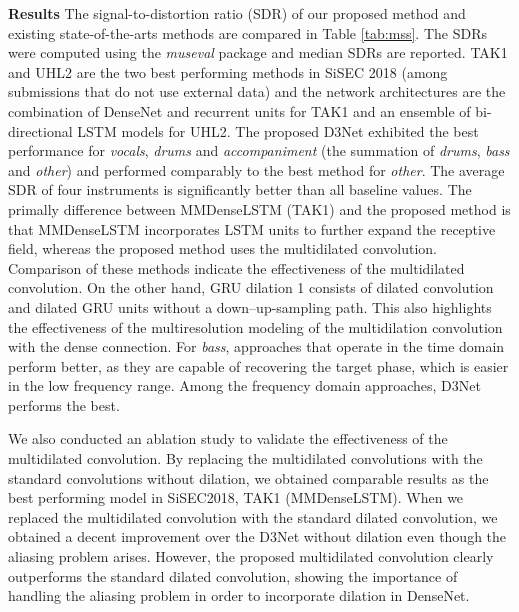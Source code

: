 \documentclass{article}
\begin{document}
\textbf{Results} \hspace{1mm}
The signal-to-distortion ratio (SDR) of our proposed method and existing state-of-the-arts methods are compared in Table \ref{tab:mss}. The SDRs were computed using  the {\it museval} package \cite{sisec2018} and median SDRs are reported. 
TAK1 \cite{Takahashi18MMDenseLSTM} and UHL2 \cite{Uhlich17} are the two best performing methods in SiSEC 2018 (among submissions that do not use external data) and the network architectures are the combination of DenseNet and recurrent units for TAK1 and an ensemble of bi-directional LSTM models for UHL2.
The proposed D3Net exhibited the best performance for \textit{vocals}, \textit{drums} and  \textit{accompaniment} (the summation of \textit{drums}, \textit{bass} and \textit{other}) and performed comparably to the best method for \textit{other}. The average SDR of four instruments is significantly better than all baseline values.
The primally difference between MMDenseLSTM (TAK1) and the proposed method is that MMDenseLSTM incorporates LSTM units to further expand the receptive field, whereas the proposed method uses the multidilated convolution. Comparison of these methods indicate the effectiveness of the multidilated convolution.
On the other hand, GRU dilation 1 \cite{Liu19} consists of dilated convolution and dilated GRU units without a down--up-sampling path. This also highlights the effectiveness of the multiresolution modeling of the multidilation convolution with the dense connection.
For \textit{bass}, approaches that operate in the time domain perform better, as they are capable of recovering the target phase, which is easier in the low frequency range. Among the frequency domain approaches, D3Net performs the best.

We also conducted an ablation study to validate the effectiveness of the multidilated convolution. By replacing the multidilated convolutions with the standard convolutions without dilation, we obtained comparable results as the best performing model in SiSEC2018, TAK1 (MMDenseLSTM). When we replaced the multidilated convolution with the standard dilated convolution, we obtained a decent improvement over the D3Net without dilation even though the aliasing problem arises. However, the proposed multidilated convolution clearly outperforms the standard dilated convolution, showing the importance of handling the aliasing problem in order to incorporate dilation in DenseNet. 
\end{document}
